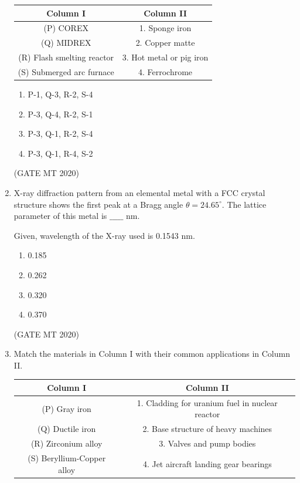 \documentclass[journal, 11pt, onecolumn]{IEEEtran}
\theoremstyle{remark}
\begin{document}
\begin{enumerate}
\begin{center}
\begin{tabular}{|c|c|}
\hline
\textbf{Column I} & \textbf{Column II} \\
\hline
(P) COREX & 1. Sponge iron \\
(Q) MIDREX & 2. Copper matte \\
(R) Flash smelting reactor & 3. Hot metal or pig iron \\
(S) Submerged arc furnace & 4. Ferrochrome \\
\hline
\end{tabular}
\end{center}

\begin{enumerate}
\item P-1, Q-3, R-2, S-4  
\item P-3, Q-4, R-2, S-1  
\item P-3, Q-1, R-2, S-4  
\item P-3, Q-1, R-4, S-2  
\end{enumerate}
\hfill(GATE MT 2020)

\item X-ray diffraction pattern from an elemental metal with a FCC crystal structure shows the first peak at a Bragg angle $\theta = 24.65^\circ$. 
The lattice parameter of this metal is $\_\_\_\_\_$ nm.  

Given, wavelength of the X-ray used is 0.1543 nm.  

\begin{enumerate}
\item 0.185  
\item 0.262  
\item 0.320  
\item 0.370  
\end{enumerate}
\hfill(GATE MT 2020)


\item Match the materials in Column I with their common applications in Column II.  

\begin{center}
\begin{tabular}{|c|c|}
\hline
\textbf{Column I} & \textbf{Column II} \\
\hline
(P) Gray iron & 1. Cladding for uranium fuel in nuclear reactor \\
(Q) Ductile iron & 2. Base structure of heavy machines \\
(R) Zirconium alloy & 3. Valves and pump bodies \\
(S) Beryllium-Copper alloy & 4. Jet aircraft landing gear bearings \\
\hline
\end{tabular}
\end{center}


\end{enumerate}
\end{document}
